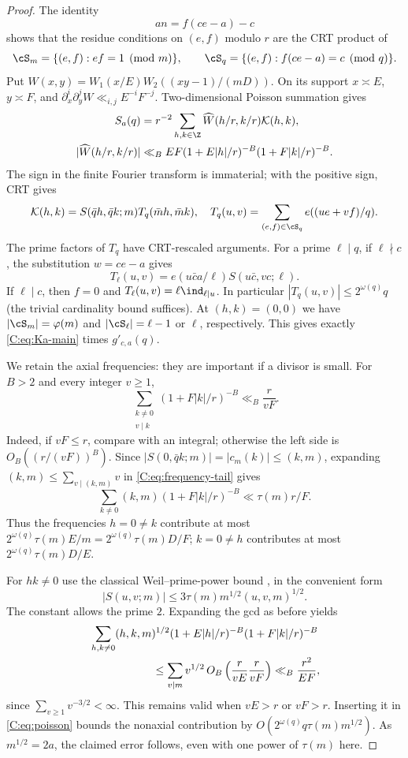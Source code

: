 \begin{proof}
The identity
\[
 an=f(ce-a)-c
\]
shows that the residue conditions on $(e,f)$ modulo $r$ are the CRT
product of
\[
 \cS_m=\{(e,f):ef=1\pmod m\},\qquad
 \cS_q=\{(e,f):f(ce-a)=c\pmod q\}.
\]
Put $W(x,y)=W_1(x/E)W_2((xy-1)/(mD))$.  On its support
$x\asymp E$, $y\asymp F$, and
$\partial_x^i\partial_y^jW\ll_{i,j}E^{-i}F^{-j}$.
Two-dimensional Poisson summation gives
\begin{equation}\label{C:eq:poisson}
 \begin{aligned}
 S_a(q)&=r^{-2}\sum_{h,k\in\Z}\widehat W(h/r,k/r)\mathcal K(h,k),\\
 |\widehat W(h/r,k/r)|&\ll_B EF
 (1+E|h|/r)^{-B}(1+F|k|/r)^{-B}.
 \end{aligned}
\end{equation}
The sign in the finite Fourier transform is immaterial; with the
positive sign, CRT gives
\[
 \mathcal K(h,k)=S(\bar qh,\bar qk;m)T_q(\bar mh,\bar mk),
 \quad T_q(u,v)=\sum_{(e,f)\in\cS_q}e((ue+vf)/q).
\]
The prime factors of $T_q$ have CRT-rescaled arguments.  For a prime
$\ell\mid q$, if $\ell\nmid c$, the substitution $w=ce-a$ gives
\[
 T_\ell(u,v)=e(u\bar ca/\ell)S(u\bar c,vc;\ell).
\]
If $\ell\mid c$, then $f=0$ and
$T_\ell(u,v)=\ell\ind_{\ell\mid u}$.  In particular
$|T_q(u,v)|\leq2^{\omega(q)}q$ (the trivial cardinality bound suffices).
At $(h,k)=(0,0)$ we have $|\cS_m|=\varphi(m)$ and
$|\cS_\ell|=\ell-1$ or $\ell$, respectively.  This gives exactly
\eqref{C:eq:Ka-main} times $g'_{c,a}(q)$.

We retain the axial frequencies: they are important if a divisor is
small.  For $B>2$ and every integer $v\geq1$,
\begin{equation}\label{C:eq:frequency-tail}
 \sum_{\substack{k\ne0\\v\mid k}}(1+F|k|/r)^{-B}\ll_B\frac r{vF}.
\end{equation}
Indeed, if $vF\leq r$, compare with an integral; otherwise the left side
is $O_B((r/(vF))^B)$.  Since
$|S(0,\bar qk;m)|=|c_m(k)|\leq(k,m)$, expanding
$(k,m)\leq\sum_{v\mid(k,m)}v$ in \eqref{C:eq:frequency-tail} gives
\[
 \sum_{k\ne0}(k,m)(1+F|k|/r)^{-B}\ll\tau(m)r/F.
\]
Thus the frequencies $h=0\ne k$ contribute at most
$2^{\omega(q)}\tau(m)E/m=2^{\omega(q)}\tau(m)D/F$;
$k=0\ne h$ contributes at most $2^{\omega(q)}\tau(m)D/E$.

For $hk\ne0$ use the classical Weil--prime-power bound
\cite{Weil}, in the convenient form
\[
 |S(u,v;m)|\leq3\tau(m)m^{1/2}(u,v,m)^{1/2}.
\]
The constant allows the prime $2$.  Expanding the gcd as before yields
\begin{align*}
 &\sum_{h,k\ne0}(h,k,m)^{1/2}
 (1+E|h|/r)^{-B}(1+F|k|/r)^{-B}\\
 &\hspace{20mm}\leq
 \sum_{v\mid m}v^{1/2}\,O_B\left(\frac r{vE}\frac r{vF}\right)
 \ll_B\frac{r^2}{EF},
\end{align*}
since $\sum_{v\geq1}v^{-3/2}<\infty$.  This remains valid when
$vE>r$ or $vF>r$.  Inserting it in \eqref{C:eq:poisson} bounds the
nonaxial contribution by
$O(2^{\omega(q)}q\tau(m)m^{1/2})$.  As $m^{1/2}=2a$, the claimed
error follows, even with one power of $\tau(m)$ here.
\end{proof}

